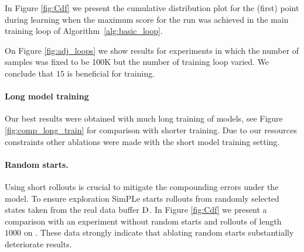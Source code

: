In Figure \ref{fig:Cdf} we present the cumulative distribution plot for the (first) point during learning when the maximum score for the run was achieved in the main training loop of Algorithm~\ref{alg:basic_loop}.

On Figure \ref{fig:adj_loops} we show results for experiments in which the number of samples was fixed to be 100K but the number of training loop varied. We conclude that $15$ is beneficial for training.

\paragraph{Long model training} Our best results were obtained with much long training of models, see Figure \ref{fig:comp_long_train} for comparison with shorter training. Due to our resources constraints other ablations were made with the short model training setting.

\paragraph{Random starts.} Using short rollouts is crucial to mitigate the compounding errors under the model. To ensure exploration SimPLe starts rollouts from randomly selected states taken from the real data buffer $\textsc{D}$. In Figure \ref{fig:Cdf} we present a comparison with an experiment without random starts and rollouts of length $1000$ on \seaquest. These data strongly indicate that ablating random starts substantially deteriorate results.  


